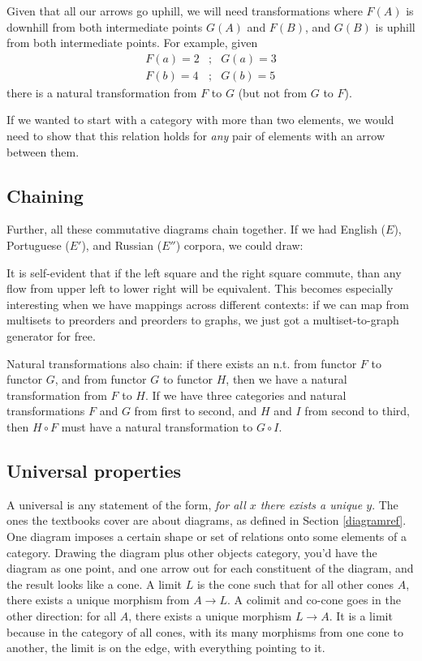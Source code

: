 \documentclass[11pt]{article}
\begin{document}
Given that all our arrows go uphill, we will need transformations where $F(A)$ is downhill
from both intermediate points $G(A)$ and $F(B)$, and $G(B)$ is uphill from both
intermediate points. For example, given
\begin{eqnarray*}
    F(a) = 2 &;& G(a) = 3\\
    F(b) = 4 &;& G(b) = 5
\end{eqnarray*} 
there is a natural transformation from $F$ to $G$ (but not from $G$ to $F$).

If we wanted to start with a category with more than two elements, we would need to show
that this relation holds for {\em any} pair of elements with an arrow between them.

\subsection{Chaining}
Further, all these commutative diagrams chain together. If we had English ($E$), Portuguese ($E'$), and
Russian  ($E''$) corpora, we could draw:


It is self-evident that if the left square and the right square commute, than any flow
from upper left to lower right will be equivalent. This becomes especially interesting
when we have mappings across different contexts: if we can map from multisets to preorders
and preorders to graphs, we just got a multiset-to-graph generator for free.

Natural transformations also chain: if there exists an n.t. from functor $F$ to functor
$G$, and from functor $G$ to functor $H$, then we have a natural transformation from $F$
to $H$. If we have three categories and natural transformations $F$ and $G$ from first to
second, and $H$ and $I$ from second to third, then $H\circ F$ must have a natural
transformation to $G\circ I$.

\subsection{Universal properties}\label{universalsec}
A universal is any statement of the form, {\em for all $x$ there exists a unique $y$}.
The ones the textbooks cover are about diagrams, as defined in Section \ref{diagramref}.
One diagram imposes a certain shape or set of relations onto some elements of a category.
Drawing the diagram plus other objects category, you'd have the diagram as one point, and
one arrow out for each constituent of the diagram, and the result looks like a cone.
A limit $L$ is the cone such that for all other cones $A$, there exists a unique
morphism from $A\to L$. A colimit and co-cone goes in the other direction: for all $A$,
there exists a unique morphism $L\to A$. It is a limit because in the category of all
cones, with its many morphisms from one cone to another, the limit is on the edge,
with everything pointing to it.
\end{document}
